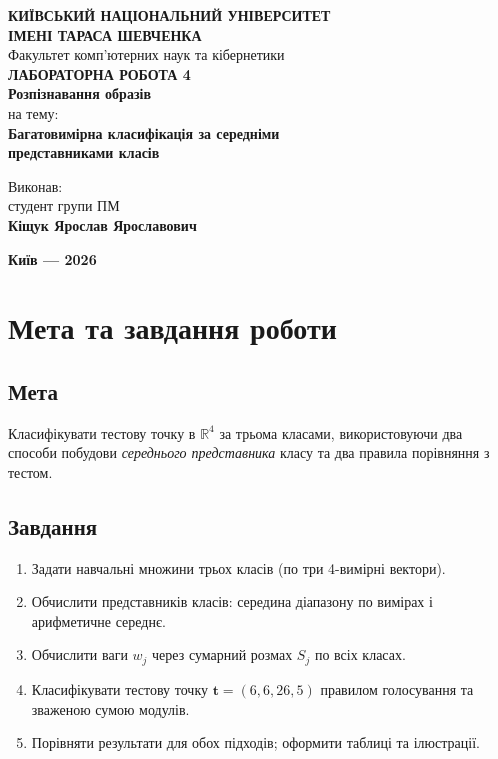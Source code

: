 \documentclass[14pt,a4paper,oneside]{extarticle}
\begin{document}
\begin{titlepage}
\thispagestyle{empty}
\begin{center}
{\Large \textbf{КИЇВСЬКИЙ НАЦІОНАЛЬНИЙ УНІВЕРСИТЕТ\\
ІМЕНІ ТАРАСА ШЕВЧЕНКА}}\\[2\baselineskip]
{\large Факультет комп'ютерних наук та кібернетики}\\[3\baselineskip]
{\Large \textbf{ЛАБОРАТОРНА РОБОТА 4}}\\[0.75\baselineskip]
{\large \textbf{Розпізнавання образів}}\\[2.5\baselineskip]
{\normalsize на тему:}\\[0.75\baselineskip]
{\large \textbf{Багатовимірна класифікація за середніми\\
представниками класів}}\\[4\baselineskip]
\end{center}
\begin{flushright}
Виконав:\\[0.25\baselineskip]
студент групи ПМ\\[0.4\baselineskip]
{\Large \textbf{Кіщук Ярослав Ярославович}}\\[2\baselineskip]
\end{flushright}
\vfill
\begin{center}
{\large \textbf{Київ --- 2026}}
\end{center}
\end{titlepage}
\clearpage

\tableofcontents
\clearpage

\section{Мета та завдання роботи}

\subsection{Мета}
Класифікувати тестову точку в $\mathbb{R}^4$ за трьома класами, використовуючи два способи побудови \emph{середнього представника} класу та два правила порівняння з тестом.

\subsection{Завдання}
\begin{enumerate}
    \item Задати навчальні множини трьох класів (по три 4-вимірні вектори).
    \item Обчислити представників класів: середина діапазону по вимірах і арифметичне середнє.
    \item Обчислити ваги $w_j$ через сумарний розмах $S_j$ по всіх класах.
    \item Класифікувати тестову точку $\mathbf{t}=(6,6,26,5)$ правилом голосування та зваженою сумою модулів.
    \item Порівняти результати для обох підходів; оформити таблиці та ілюстрації.
\end{enumerate}
\end{document}
